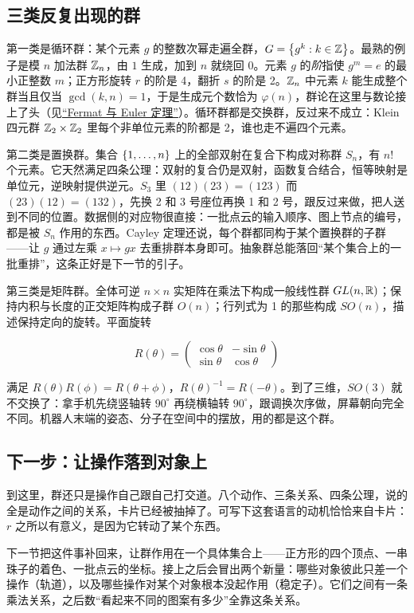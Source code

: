 \subsection{三类反复出现的群}

第一类是循环群：某个元素 \(g\) 的整数次幂走遍全群，\(G=\left\{g^k:k\in\mathbb{Z}\right\}\)。最熟的例子是模 \(n\) 加法群 \(\mathbb{Z}_n\)，由 \(1\) 生成，加到 \(n\) 就绕回 \(0\)。元素 \(g\) 的\emph{阶}指使 \(g^m=e\) 的最小正整数 \(m\)；正方形旋转 \(r\) 的阶是 4，翻折 \(s\) 的阶是 2。\(\mathbb{Z}_n\) 中元素 \(k\) 能生成整个群当且仅当 \(\gcd(k,n)=1\)，于是生成元个数恰为 \(\varphi(n)\)，群论在这里与数论接上了头（见\hyperref[sec:04-Discrete-Mathematics/04-Number-Theory/03]{``Fermat 与 Euler 定理''}）。循环群都是交换群，反过来不成立：Klein 四元群 \(\mathbb{Z}_2\times\mathbb{Z}_2\) 里每个非单位元素的阶都是 2，谁也走不遍四个元素。

第二类是置换群。集合 \(\left\{1,\ldots,n\right\}\) 上的全部双射在复合下构成对称群 \(S_n\)，有 \(n!\) 个元素。它天然满足四条公理：双射的复合仍是双射，函数复合结合，恒等映射是单位元，逆映射提供逆元。\(S_3\) 里 \((12)(23)=(123)\) 而 \((23)(12)=(132)\)，先换 2 和 3 号座位再换 1 和 2 号，跟反过来做，把人送到不同的位置。数据侧的对应物很直接：一批点云的输入顺序、图上节点的编号，都是被 \(S_n\) 作用的东西。Cayley 定理还说，每个群都同构于某个置换群的子群——让 \(g\) 通过左乘 \(x\mapsto gx\) 去重排群本身即可。抽象群总能落回``某个集合上的一批重排''，这条正好是下一节的引子。

第三类是矩阵群。全体可逆 \(n\times n\) 实矩阵在乘法下构成一般线性群 \(GL(n,\mathbb{R})\)；保持内积与长度的正交矩阵构成子群 \(O(n)\)；行列式为 1 的那些构成 \(SO(n)\)，描述保持定向的旋转。平面旋转

\[
R(\theta)=\begin{pmatrix}\cos\theta&-\sin\theta\\\sin\theta&\cos\theta\end{pmatrix}
\]

满足 \(R(\theta)R(\phi)=R(\theta+\phi)\)，\(R(\theta)^{-1}=R(-\theta)\)。到了三维，\(SO(3)\) 就不交换了：拿手机先绕竖轴转 \(90^\circ\) 再绕横轴转 \(90^\circ\)，跟调换次序做，屏幕朝向完全不同。机器人末端的姿态、分子在空间中的摆放，用的都是这个群。

\subsection{下一步：让操作落到对象上}

到这里，群还只是操作自己跟自己打交道。八个动作、三条关系、四条公理，说的全是动作之间的关系，卡片已经被抽掉了。可写下这套语言的动机恰恰来自卡片：\(r\) 之所以有意义，是因为它转动了某个东西。

下一节把这件事补回来，让群作用在一个具体集合上——正方形的四个顶点、一串珠子的着色、一批点云的坐标。接上之后会冒出两个新量：哪些对象彼此只差一个操作（轨道），以及哪些操作对某个对象根本没起作用（稳定子）。它们之间有一条乘法关系，之后数``看起来不同的图案有多少''全靠这条关系。
